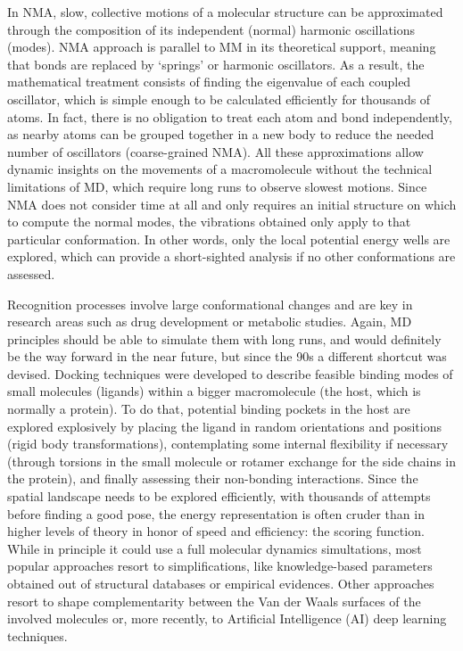 In NMA, slow, collective motions of a molecular structure can be approximated through the composition of its independent (normal) harmonic oscillations (modes). NMA approach is parallel to MM in its theoretical support, meaning that bonds are replaced by ‘springs’ or harmonic oscillators. As a result, the mathematical treatment consists of finding the eigenvalue of each coupled oscillator, which is simple enough to be calculated efficiently for thousands of atoms. In fact, there is no obligation to treat each atom and bond independently, as nearby atoms can be grouped together in a new body to reduce the needed number of oscillators (coarse-grained NMA). All these approximations allow dynamic insights on the movements of a macromolecule without the technical limitations of MD, which require long runs to observe slowest motions. Since NMA does not consider time at all and only requires an initial structure on which to compute the normal modes, the vibrations obtained only apply to that particular conformation. In other words, only the local potential energy wells are explored, which can provide a short-sighted analysis if no other conformations are assessed.

Recognition processes involve large conformational changes and are key in research areas such as drug development or metabolic studies. Again, MD principles should be able to simulate them with long runs, and would definitely be the way forward in the near future,\cite{devivo2017} but since the 90s a different shortcut was devised. Docking techniques were developed to describe feasible binding modes of small molecules (ligands) within a bigger macromolecule (the host, which is normally a protein). To do that, potential binding pockets in the host are explored explosively by placing the ligand in random orientations and positions (rigid body transformations), contemplating some internal flexibility if necessary (through torsions in the small molecule or rotamer exchange for the side chains in the protein), and finally assessing their non-bonding interactions. Since the spatial landscape needs to be explored efficiently, with thousands of attempts before finding a good pose, the energy representation is often cruder than in higher levels of theory in honor of speed and efficiency: the scoring function. While in principle it could use a full molecular dynamics simultations,\cite{Soderhjelm_Tribello_Parrinello_2012} most popular approaches resort to simplifications, like knowledge-based parameters obtained out of structural databases\cite{neudert2011dsx} or empirical evidences.\cite{morris1998automated,baxter1998flexible,korb2009empirical} Other approaches resort to shape complementarity between the Van der Waals surfaces of the involved molecules\cite{venkatachalam2003ligandfit,gabb1997modelling,shoichet1992molecular} or, more recently, to Artificial Intelligence (AI) deep learning techniques.\cite{khamis2015machine}

